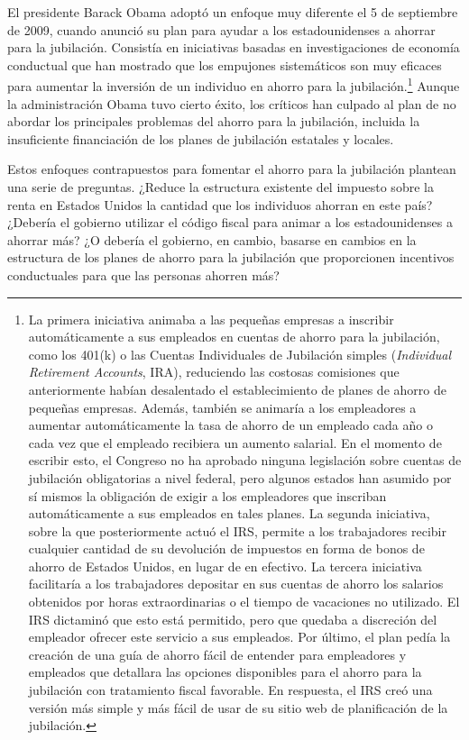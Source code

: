 \documentclass[10pt,a4paper]{article}
\begin{document}
El presidente Barack Obama adoptó un enfoque muy diferente el 5 de septiembre de 2009, cuando anunció su plan para ayudar a los estadounidenses a ahorrar para la jubilación. Consistía en iniciativas basadas en investigaciones de economía conductual que han mostrado que los empujones sistemáticos son muy eficaces para aumentar la inversión de un individuo en ahorro para la jubilación.\footnote{%
    La primera iniciativa animaba a las pequeñas empresas a inscribir automáticamente a sus empleados en cuentas de ahorro para la jubilación, como los 401(k) o las Cuentas Individuales de Jubilación simples (\textit{Individual Retirement Accounts}, IRA), reduciendo las costosas comisiones que anteriormente habían desalentado el establecimiento de planes de ahorro de pequeñas empresas. Además, también se animaría a los empleadores a aumentar automáticamente la tasa de ahorro de un empleado cada año o cada vez que el empleado recibiera un aumento salarial. En el momento de escribir esto, el Congreso no ha aprobado ninguna legislación sobre cuentas de jubilación obligatorias a nivel federal, pero algunos estados han asumido por sí mismos la obligación de exigir a los empleadores que inscriban automáticamente a sus empleados en tales planes. La segunda iniciativa, sobre la que posteriormente actuó el IRS, permite a los trabajadores recibir cualquier cantidad de su devolución de impuestos en forma de bonos de ahorro de Estados Unidos, en lugar de en efectivo. La tercera iniciativa facilitaría a los trabajadores depositar en sus cuentas de ahorro los salarios obtenidos por horas extraordinarias o el tiempo de vacaciones no utilizado. El IRS dictaminó que esto está permitido, pero que quedaba a discreción del empleador ofrecer este servicio a sus empleados. Por último, el plan pedía la creación de una guía de ahorro fácil de entender para empleadores y empleados que detallara las opciones disponibles para el ahorro para la jubilación con tratamiento fiscal favorable. En respuesta, el IRS creó una versión más simple y más fácil de usar de su sitio web de planificación de la jubilación.
} Aunque la administración Obama tuvo cierto éxito, los críticos han culpado al plan de no abordar los principales problemas del ahorro para la jubilación, incluida la insuficiente financiación de los planes de jubilación estatales y locales.

Estos enfoques contrapuestos para fomentar el ahorro para la jubilación plantean una serie de preguntas. ¿Reduce la estructura existente del impuesto sobre la renta en Estados Unidos la cantidad que los individuos ahorran en este país? ¿Debería el gobierno utilizar el código fiscal para animar a los estadounidenses a ahorrar más? ¿O debería el gobierno, en cambio, basarse en cambios en la estructura de los planes de ahorro para la jubilación que proporcionen incentivos conductuales para que las personas ahorren más?
\end{document}
